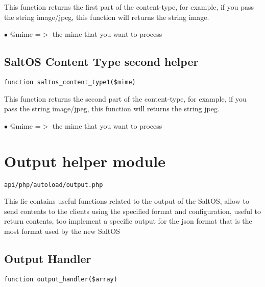 \documentclass[a4paper]{book}
\begin{document}
This function returns the first part of the content-type, for example, if you
pass the string image/jpeg, this function will returns the string image.

\begin{compactitem}
\item[\color{myblue}$\bullet$] @mime =$>$ the mime that you want to process
\end{compactitem}

\hypertarget{toc211}{}
\subsection{SaltOS Content Type second helper}

\begin{lstlisting}
function saltos_content_type1($mime)
\end{lstlisting}

This function returns the second part of the content-type, for example, if you
pass the string image/jpeg, this function will returns the string jpeg.

\begin{compactitem}
\item[\color{myblue}$\bullet$] @mime =$>$ the mime that you want to process
\end{compactitem}

\hypertarget{toc212}{}
\section{Output helper module}

\begin{lstlisting}
api/php/autoload/output.php
\end{lstlisting}

This fie contains useful functions related to the output of the SaltOS, allow to send contents to
the clients using the specified format and configuration, useful to return contents, too implement
a specific output for the json format that is the most format used by the new SaltOS

\hypertarget{toc213}{}
\subsection{Output Handler}

\begin{lstlisting}
function output_handler($array)
\end{lstlisting}
\end{document}
